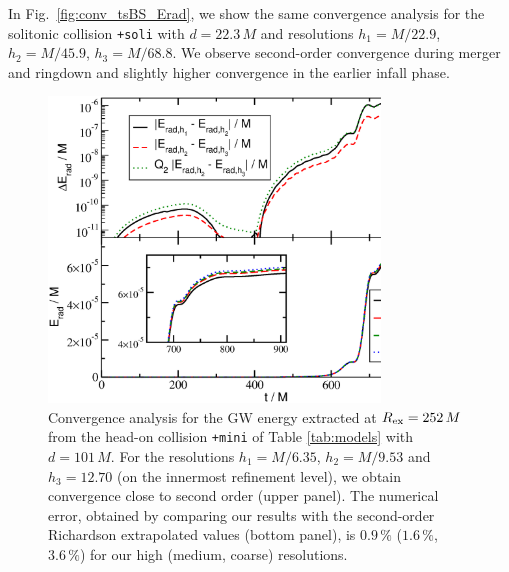 \documentclass[]{iopart}
\begin{document}
In Fig.~\ref{fig:conv_tsBS_Erad}, we show the same
convergence analysis for the solitonic collision
{\tt +soli} with $d=22.3\,M$ and resolutions
$h_1=M/22.9$, $h_2=M/45.9$, $h_3=M/68.8$. We observe
second-order convergence during merger and ringdown and
slightly higher convergence in the earlier infall phase.
%
\begin{figure}[t]
    \centering
    \includegraphics[width=250pt]{conv_tmBS_Erad.eps}
    \caption{
    Convergence analysis for the GW energy extracted at
    $R_{\rm ex}=252\,M$ from the head-on collision
    {\tt +mini} of Table \ref{tab:models} with
    $d=101\,M$. For the resolutions
    $h_1=M/6.35$, $h_2=M/9.53$ and $h_3=12.70$
    (on the innermost refinement level),
    we obtain convergence close to second order
    (upper panel). The numerical error,
    obtained by comparing our results
    with the second-order Richardson extrapolated values
    (bottom panel), is $0.9\,\%$ ($1.6\,\%$, $3.6\,\%$) for
    our high (medium, coarse) resolutions.
    }
    \label{fig:conv_tmBS_Erad}
\end{figure}
%
%
\end{document}
